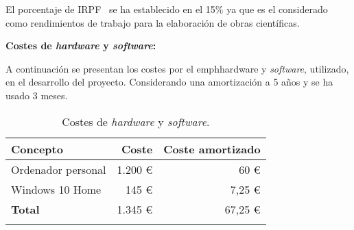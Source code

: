 El porcentaje de IRPF~\cite{IRPF} se ha establecido en el 15\% ya que es el considerado como rendimientos de trabajo para la elaboración de obras científicas.

\textbf{Costes de \emph{hardware} y \emph{software}:}

A continuación se presentan los costes por el emph{hardware} y \emph{software}, utilizado, en el desarrollo del proyecto. Considerando una amortización a 5 años y se ha usado 3 meses.

\begin{longtable}[]{@{}lrr@{}}
\toprule
\begin{minipage}[b]{0.4\columnwidth}\raggedright\strut
\textbf{Concepto}\strut
\end{minipage} & \begin{minipage}[b]{0.18\columnwidth}\raggedright\strut
\textbf{Coste}\strut
\end{minipage} & \begin{minipage}[b]{0.32\columnwidth}\raggedright\strut
\textbf{Coste amortizado}\strut
\end{minipage}\tabularnewline
\midrule
\endhead
\begin{minipage}[t]{0.4\columnwidth}\raggedright\strut
Ordenador personal\strut
\end{minipage} & \begin{minipage}[t]{0.18\columnwidth}\raggedright\strut
1.200 \euro{}\strut
\end{minipage} & \begin{minipage}[t]{0.32\columnwidth}\raggedright\strut
60 \euro{}\strut
\end{minipage}\tabularnewline
\begin{minipage}[t]{0.4\columnwidth}\raggedright\strut
Windows 10 Home\strut
\end{minipage} & \begin{minipage}[t]{0.18\columnwidth}\raggedright\strut
145 \euro{}\strut
\end{minipage} & \begin{minipage}[t]{0.32\columnwidth}\raggedright\strut
7,25 \euro{}\strut
\end{minipage}\tabularnewline
\midrule
\begin{minipage}[t]{0.4\columnwidth}\raggedright\strut
\textbf{Total}\strut
\end{minipage} & \begin{minipage}[t]{0.18\columnwidth}\raggedright\strut
1.345 \euro{}\strut
\end{minipage} & \begin{minipage}[t]{0.32\columnwidth}\raggedright\strut
67,25 \euro{}\strut
\end{minipage}\tabularnewline
\bottomrule
\caption{Costes de \emph{hardware} y \emph{software}.}
\end{longtable}

